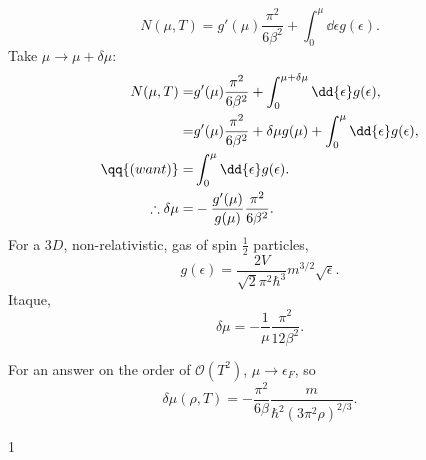 \documentclass[a4paper,12pt,twoside]{article}
\newcommand{\mcols}{0}
\begin{document}
\begin{multicols*}{2}
\subsection{}
\begin{equation}
	N(\mu,T) = g'(\mu) \frac{\pi^2}{6\beta^2} + \int_0^\mu \dd{\epsilon} g(\epsilon).
\end{equation}
Take $\mu \rightarrow \mu+\delta\mu$:
\begin{align}
	N(\mu,T) =& g'(\mu) \frac{\pi^2}{6\beta^2} + \int_0^{\mu+\delta\mu} \dd{\epsilon} g(\epsilon),\\
	=& g'(\mu) \frac{\pi^2}{6\beta^2} + \delta\mu g(\mu) + \int_0^\mu \dd{\epsilon} g(\epsilon),\\
	\qq{(want)}=& \int_0^\mu \dd{\epsilon} g(\epsilon).\\
	\therefore \delta\mu =& -\frac{g'(\mu)}{g(\mu)} \frac{\pi^2}{6\beta^2}.
\end{align}
For a $3D$, non-relativistic, gas of spin $\frac{1}{2}$ particles,
\begin{equation}
	g(\epsilon) = \frac{2V}{\sqrt{2}\pi^2\hbar^3} m^{3/2}\sqrt{\epsilon}.
\end{equation}
Itaque,
\begin{equation}
	\delta\mu = -\frac{1}{\mu} \frac{\pi^2}{12\beta^2}.
\end{equation}

For an answer on the order of $\mathcal{O}(T^2)$, $\mu \rightarrow \epsilon_F$, so
\begin{equation}
	\delta\mu(\rho,T) = -\frac{\pi^2}{6\beta} \frac{m}{\hbar^2 (3\pi^2 \rho)^{2/3}}.
\end{equation}

\printBib


\if\mcols1
\end{multicols*}
\fi
\end{document}
